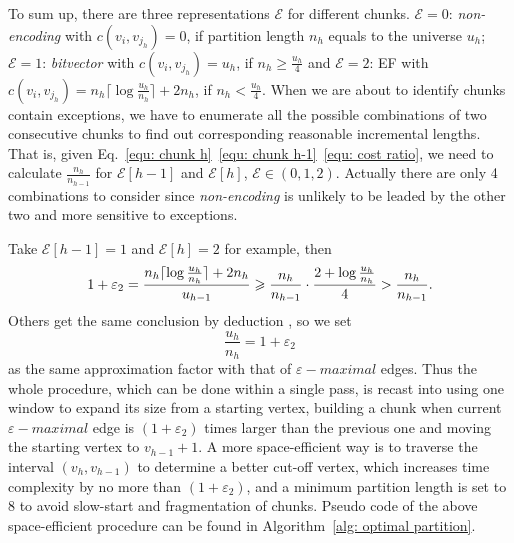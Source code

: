 \documentclass[runningheads,a4paper]{llncs}
\begin{document}
To sum up, there are three representations $ \mathcal{E} $ for different chunks. $ \mathcal{E}=0 $: \textit{non-encoding} with $c\left(v_{i},v_{j_{h}}\right)=0$, if partition length $n_{h}$ equals to the universe $u_{h}$; $ \mathcal{E}=1 $: \textit{bitvector} with $c\left(v_{i},v_{j_{h}}\right)=u_{h}$, if $n_{h}\geqslant \frac{u_{h}}{4}$ and $ \mathcal{E}=2 $: EF with $c\left(v_{i},v_{j_{h}}\right)=n_{h}\lceil\log \frac{u_{h}}{n_{h}}\rceil+2n_{h}$, if $n_{h}<\frac{u_{h}}{4}$.
When we are about to identify chunks contain exceptions, we have to enumerate all the possible combinations of two consecutive chunks to find out corresponding reasonable incremental lengths.
That is, given Eq.~\eqref{equ: chunk h}~\eqref{equ: chunk h-1}~\eqref{equ: cost ratio}, we need to calculate $ \frac{n_h}{n_{h-1}} $ for $ \mathcal{E}[h-1] $ and $ \mathcal{E}[h] $, $ \mathcal{E} \in (0,1,2) $.
Actually there are only 4 combinations to consider since \textit{non-encoding} is unlikely to be leaded by the other two and more sensitive to exceptions.

Take $ \mathcal{E}[h-1]=1 $ and $ \mathcal{E}[h]=2 $ for example, then
\begin{displaymath}
\noindent
1+\varepsilon_{2}=\frac{n_{h}\lceil\log \frac{u_{h}}{n_{h}}\rceil+2n_{h}}{u_{h-1}}\geqslant \frac{n_{h}}{n_{h-1}}\cdot \frac{2+\log \frac{u_{h}}{n_{h}}}{4}>\frac{n_{h}}{n_{h-1}}.
\end{displaymath}
Others get the same conclusion by deduction
, so we set
\begin{equation}
\frac{u_{h}}{n_{h}}=1+\varepsilon_2
\end{equation}
as the same approximation factor with that of $\varepsilon-maximal$ edges.
Thus the whole procedure, which can be done within a single pass, is recast into using one window to expand its size from a starting vertex, building a chunk when current $\varepsilon-maximal$ edge is $\left(1+\varepsilon_{2}\right)$ times larger than the previous one and moving the starting vertex to $v_{h-1}+1$. A more space-efficient way is to traverse the interval $\left(v_{h},v_{h-1}\right)$ to determine a better cut-off vertex, which increases time complexity by no more than $\left(1+\varepsilon_{2}\right)$, and a minimum partition length is set to 8 to avoid slow-start and fragmentation of chunks.
Pseudo code of the above space-efficient procedure can be found in Algorithm~\ref{alg: optimal partition}.
\end{document}
